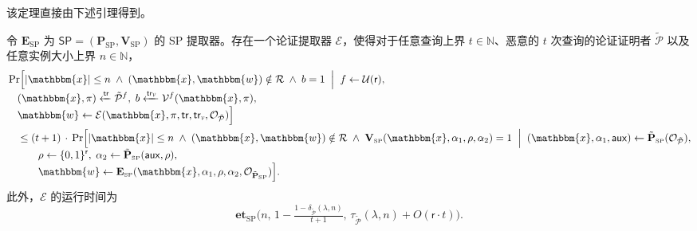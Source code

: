 \documentclass[american,singlepageview]{snargs-book-zh}
\newcommand{\Bits}{\{0,1\}}
\newcommand{\Malicious}[1]{\tilde{#1}}
\newcommand{\AuxiliaryState}{\mathsf{aux}}
\newcommand{\BlackBox}[1]{\mathcal{O}_{#1}}
\newcommand{\DecisionBit}{b}
\newcommand{\SomeSize}[1]{|#1|}
\newcommand{\Naturals}{\mathbb{N}}
\newcommand{\Relation}{\mathcal{R}}
\newcommand{\Instance}{\mathbbm{x}}
\newcommand{\Witness}{\mathbbm{w}}
\newcommand{\InstanceSize}{n}
\newcommand{\ProtoProver}{P}
\newcommand{\ProtoVerifier}{V}
\newcommand{\ProtoExtractor}{E}
\newcommand{\ProtoKnowledgeTime}{\mathbf{et}}
\newcommand{\ProtoRandomnessComplexity}{\mathsf{r}}
\newcommand{\SPSymbol}{\mathsf{SP}}
\newcommand{\SPSubscript}{\scriptscriptstyle\mathrm{SP}}
\newcommand{\SPFormat}[1]{\mathbf{#1}}
\newcommand{\SPProver}{\SPFormat{\ProtoProver}_{\SPSubscript}}
\newcommand{\SPVerifier}{\SPFormat{\ProtoVerifier}_{\SPSubscript}}
\newcommand{\SPExtractor}{\SPFormat{\ProtoExtractor}_{\SPSubscript}}
\newcommand{\SPKnowledgeTime}{\ProtoKnowledgeTime_{\SPSubscript}}
\newcommand{\SPMaliciousProver}{\Malicious{\SPFormat{\ProtoProver}}_{\SPSubscript}}
\newcommand{\SPSystem}{(\SPProver,\SPVerifier)}
\newcommand{\SPCommitment}{\alpha_{1}}
\newcommand{\SPChallenge}{\rho}
\newcommand{\SPResponse}{\alpha_{2}}
\newcommand{\SPRandomnessComplexity}{\ProtoRandomnessComplexity}
\newcommand{\ARGFormat}[1]{\mathcal{#1}}
\newcommand{\ARGProver}{\ARGFormat{\ProtoProver}}
\newcommand{\ARGVerifier}{\ARGFormat{\ProtoVerifier}}
\newcommand{\ARGExtractor}{\ARGFormat{\ProtoExtractor}}
\newcommand{\ARGString}{\pi}
\newcommand{\ProverFailureProbability}[1]{\delta_{#1}}
\newcommand{\ProverRunningTime}[1]{\tau_{#1}}
\newcommand{\ROFunction}{f}
\newcommand{\ROQueryBound}{t}
\newcommand{\RODistribution}[1]{\mathcal{U}(#1)}
\newcommand{\SecurityParameter}{\lambda}
\newcommand{\ROTrace}{\mathsf{tr}}
\newcommand{\ROTraceVerifier}{\ROTrace_{\scalebox{0.5}{$\ARGVerifier$}}}
\begin{document}
该定理直接由下述引理得到。

\begin{lemma}
\label{lemma:fs-for-sp-adaptive-knowledge-soundness}
令 $\SPExtractor$ 为 $\SPSymbol=\SPSystem$ 的 SP 提取器。存在一个论证提取器 $\ARGExtractor$，使得对于任意查询上界 $\ROQueryBound\in\Naturals$、恶意的 $\ROQueryBound$ 次查询的论证证明者 $\Malicious{\ARGProver}$ 以及任意实例大小上界 $\InstanceSize\in\Naturals$，
\begin{align*}
& \Pr\Bigl[
  \SomeSize{\Instance}\le\InstanceSize
  \;\land\;
  (\Instance,\Witness)\notin\Relation
  \;\land\;
  \DecisionBit=1
\;\Bigm|\;
  \ROFunction\gets\RODistribution{\SPRandomnessComplexity},\\[-0.3em]
&\quad
  (\Instance,\ARGString)\xleftarrow{\ROTrace}\Malicious{\ARGProver}^{\ROFunction},\;
  \DecisionBit\xleftarrow{\ROTraceVerifier}\ARGVerifier^{\ROFunction}(\Instance,\ARGString),\\[-0.3em]
&\quad
  \Witness\gets\ARGExtractor(\Instance,\ARGString,\ROTrace,\ROTraceVerifier,\BlackBox{\Malicious{\ARGProver}})
\Bigr]\\
&\quad\le
(\ROQueryBound+1)\,\cdot\,
\Pr\Bigl[
  \SomeSize{\Instance}\le\InstanceSize
  \;\land\;
  (\Instance,\Witness)\notin\Relation
  \;\land\;
  \SPVerifier(\Instance,\SPCommitment,\SPChallenge,\SPResponse)=1
\;\Bigm|\;
  (\Instance,\SPCommitment,\AuxiliaryState)\gets\SPMaliciousProver(\BlackBox{\Malicious{\ARGProver}}),\\[-0.3em]
&\qquad\quad
  \SPChallenge\gets\Bits^{\SPRandomnessComplexity},\;
  \SPResponse\gets\SPMaliciousProver(\AuxiliaryState,\SPChallenge),\\[-0.3em]
&\qquad\quad
  \Witness\gets\SPExtractor(\Instance,\SPCommitment,\SPChallenge,\SPResponse,\BlackBox{\SPMaliciousProver})
\Bigr].
\end{align*}
此外，$\ARGExtractor$ 的运行时间为
\[
  \SPKnowledgeTime\bigl(\InstanceSize,\,
    1-\tfrac{1-\ProverFailureProbability{\Malicious{\ARGProver}}(\SecurityParameter,\InstanceSize)}
              {\ROQueryBound+1},\,
    \ProverRunningTime{\Malicious{\ARGProver}}(\SecurityParameter,\InstanceSize)
    +O(\SPRandomnessComplexity\cdot\ROQueryBound)
  \bigr).
\]
\end{lemma}
\end{document}
